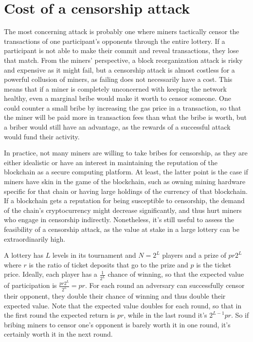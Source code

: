 \section{Cost of a censorship attack}
\label{sec:censorship}
The most concerning attack is probably one where miners tactically censor the transactions of one participant's opponents through the entire lottery. If a participant is not able to make their commit and reveal transactions, they lose that match. From the miners' perspective, a block reorganization attack is risky and expensive as it might fail, but a censorship attack is almost costless for a powerful collusion of miners, as failing does not necessarily have a cost. This means that if a miner is completely unconcerned with keeping the network healthy, even a marginal bribe would make it worth to censor someone. One could counter a small bribe by increasing the gas price in a transaction, so that the miner will be paid more in transaction fees than what the bribe is worth, but a briber would still have an advantage, as the rewards of a successful attack would fund their activity. 

In practice, not many miners are willing to take bribes for censorship, as they are either idealistic or have an interest in maintaining the reputation of the blockchain as a secure computing platform. At least, the latter point is the case if miners have skin in the game of the blockchain, such as owning mining hardware specific for that chain or having large holdings of the currency of that blockchain. If a blockchain gets a reputation for being susceptible to censorship, the demand of the chain's cryptocurrency might decrease significantly, and thus hurt miners who engage in censorship indirectly. Nonetheless, it's still useful to assess the feasibility of a censorship attack, as the value at stake in a large lottery can be extraordinarily high.

A lottery has $L$ levels in its tournament and $N=2^L$ players and a prize of $p r 2^L$ where $r$ is the ratio of ticket deposits that go to the prize and $p$ is the ticket price. Ideally, each player has a $\frac{1}{2^L}$ chance of winning, so that the expected value of participation is $\frac{p r 2^L}{2^L}=pr$. For each round an adversary can successfully censor their opponent, they double their chance of winning and thus double their expected value. Note that the expected value doubles for each round, so that in the first round the expected return is $pr$, while in the last round it's $2^{L-1}pr$. So if bribing miners to censor one's opponent is barely worth it in one round, it's certainly worth it in the next round.

